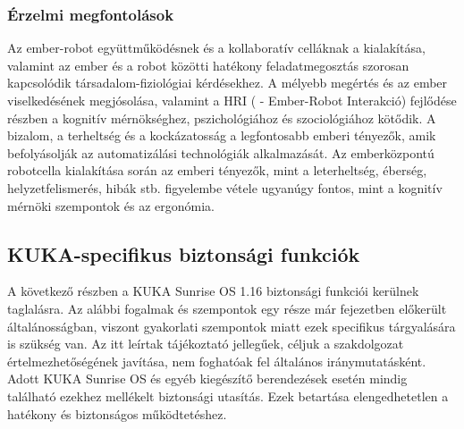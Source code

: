 \documentclass[../documentation.tex]{subfiles}
\begin{document}
\subsubsection{Érzelmi megfontolások}
Az ember-robot együttműködésnek és a kollaboratív celláknak a kialakítása, valamint az ember és a robot közötti hatékony feladatmegosztás szorosan kapcsolódik társadalom-fiziológiai kérdésekhez. A mélyebb megértés és az ember viselkedésének megjósolása, valamint a HRI ( - Ember-Robot Interakció) fejlődése részben a kognitív mérnökséghez, pszichológiához és szociológiához kötődik. A bizalom, a terheltség és a kockázatosság a legfontosabb emberi tényezők, amik befolyásolják az automatizálási technológiák alkalmazását. Az emberközpontú robotcella kialakítása során az emberi tényezők, mint a leterheltség, éberség, helyzetfelismerés, hibák stb. figyelembe vétele ugyanúgy fontos, mint a kognitív mérnöki szempontok és az ergonómia\cite{humanfactors}.

\subsection{KUKA-specifikus biztonsági funkciók}
A következő részben a KUKA Sunrise OS 1.16\cite{sunrisemanual} biztonsági funkciói kerülnek taglalásra. Az alábbi fogalmak és szempontok egy része már  fejezetben előkerült általánosságban, viszont gyakorlati szempontok miatt ezek specifikus tárgyalására is szükség van. Az itt leírtak tájékoztató jellegűek, céljuk a szakdolgozat értelmezhetőségének javítása, nem foghatóak fel általános iránymutatásként. Adott KUKA Sunrise OS és egyéb kiegészítő berendezések esetén mindig található ezekhez mellékelt biztonsági utasítás. Ezek betartása elengedhetetlen a hatékony és biztonságos működtetéshez.
\end{document}
